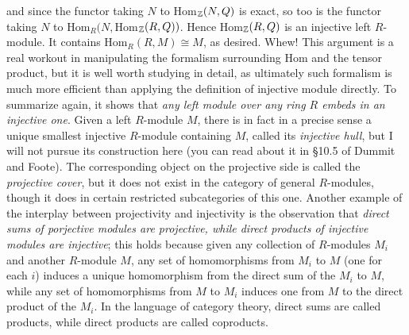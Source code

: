 \documentclass[10pt]{article}
\begin{document}
and since the functor taking $N$ to Hom$_{\Bbb Z}(N,Q)$ is exact, so too
is the functor taking $N$ to Hom$_R(N,$Hom$_{\Bbb Z}(R,Q))$. Hence
Hom$_{\Bbb Z}(R,Q)$ is an injective left $R$-module. It contains
Hom$_R(R,M)\cong M$, as desired. Whew! This argument is a real workout
in manipulating the formalism surrounding Hom and the tensor product,
but it is well worth studying in detail, as ultimately such formalism is
much more efficient than applying the definition of injective module
directly. To summarize again, it shows that {\sl any left module over
  any ring $R$ embeds in an injective one}. Given a left $R$-module $M$,
there is in fact in a precise sense a unique smallest injective
$R$-module containing $M$, called its {\sl injective hull}, but I will
not pursue its construction here (you can read about it in \S10.5 of
Dummit and Foote). The corresponding object on the projective side is
called the {\sl projective cover}, but it does not exist in the category
of general $R$-modules, though it does in certain restricted
subcategories of this one. Another example of the interplay between
projectivity and injectivity is the observation that {\sl direct sums of
  porjective modules are projective, while direct products of injective
  modules are injective}; this holds because given any collection of
$R$-modules $M_i$ and another $R$-module $M$, any set of homomorphisms
from $M_i$ to $M$ (one for each $i$) induces a unique homomorphism from
the direct sum of the $M_i$ to $M$, while any set of homomorphisms from
$M$ to $M_i$ induces one from $M$ to the direct product of the $M_i$. In
the language of category theory, direct sums are called products, while
direct products are called coproducts.
\end{document}
